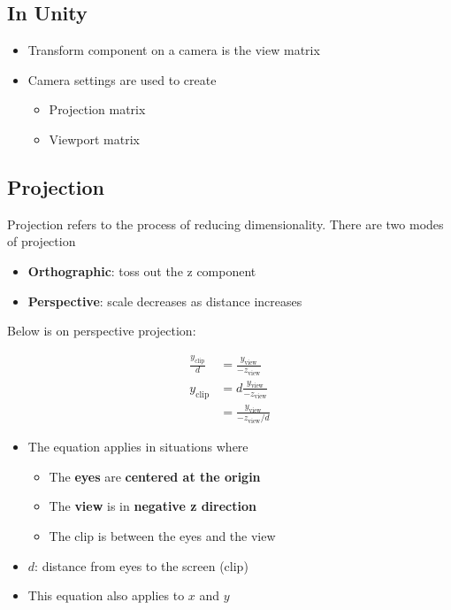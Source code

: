   \subsection{In Unity}

    \begin{itemize}
      \item Transform component on a camera is the view matrix
      \item Camera settings are used to create
      \begin{itemize}
        \item Projection matrix
        \item Viewport matrix
      \end{itemize}
    \end{itemize}

  \subsection{Projection}

    Projection refers to the process of reducing dimensionality. There are two
    modes of projection

    \begin{itemize}
      \item \textbf{Orthographic}: toss out the z component
      \item \textbf{Perspective}: scale decreases as distance increases
    \end{itemize}

    Below is on perspective projection:

    \begin{align}
      \frac{y_{\text{clip}}}{d} &= \frac{y_{\text{view}}}{-z_{\text{view}}} \\
      y_{\text{clip}}
      &= d\frac{y_ {\text{view}}}{-z_{\text{view}}} \\
      &= \frac{y_{\text{view}}}{-z_{\text{view}} / d}
    \end{align}

    \begin{itemize}
      \item The equation applies in situations where
      \begin{itemize}
        \item The \textbf{eyes} are \textbf{centered at the origin}
        \item The \textbf{view} is in \textbf{negative z direction}
        \item The clip is between the eyes and the view
      \end{itemize}

      \item $ d $: distance from eyes to the screen (clip)
      \item This equation also applies to $ x $ and $ y $
    \end{itemize}

